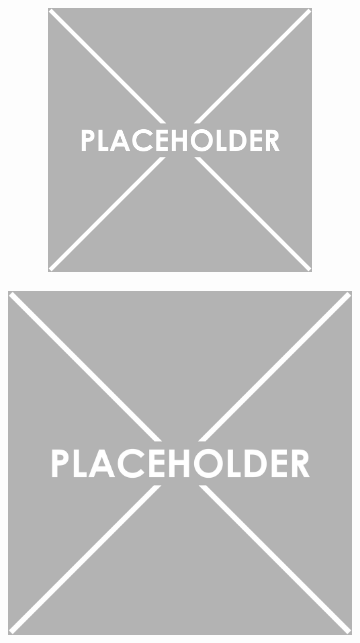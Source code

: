 \documentclass{article}
\begin{document}
\begin{figure}[ht]
\begin{subfigure}{0.2\textwidth}
        \begin{subfigure}{\textwidth}
            \centering
            \includegraphics[width=\linewidth]{placeholder.png}
        \end{subfigure}%
    \end{subfigure}%
    \begin{subfigure}{0.4\textwidth}
        \centering
        \includegraphics[width=\linewidth]{placeholder.png}

\end{subfigure}
\end{figure}
\end{document}
